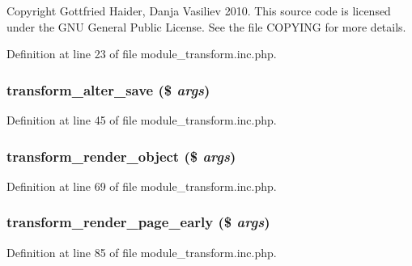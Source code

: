 Copyright Gottfried Haider, Danja Vasiliev 2010. This source code is licensed under the GNU General Public License. See the file COPYING for more details. 

Definition at line 23 of file module\_\-transform.inc.php.

\hypertarget{module__transform_8inc_8php_a3a3d726aef41e0bc7b2801adffa36bf8}{
\subsubsection[{transform\_\-alter\_\-save}]{\setlength{\rightskip}{0pt plus 5cm}transform\_\-alter\_\-save (\$ {\em args})}}
\label{module__transform_8inc_8php_a3a3d726aef41e0bc7b2801adffa36bf8}


Definition at line 45 of file module\_\-transform.inc.php.

\hypertarget{module__transform_8inc_8php_ab188b6fd81671c7a8d13db5c437ce8c2}{
\subsubsection[{transform\_\-render\_\-object}]{\setlength{\rightskip}{0pt plus 5cm}transform\_\-render\_\-object (\$ {\em args})}}
\label{module__transform_8inc_8php_ab188b6fd81671c7a8d13db5c437ce8c2}


Definition at line 69 of file module\_\-transform.inc.php.

\hypertarget{module__transform_8inc_8php_ab7e13589fab3f7511bdfe49559697d14}{
\subsubsection[{transform\_\-render\_\-page\_\-early}]{\setlength{\rightskip}{0pt plus 5cm}transform\_\-render\_\-page\_\-early (\$ {\em args})}}
\label{module__transform_8inc_8php_ab7e13589fab3f7511bdfe49559697d14}


Definition at line 85 of file module\_\-transform.inc.php.

